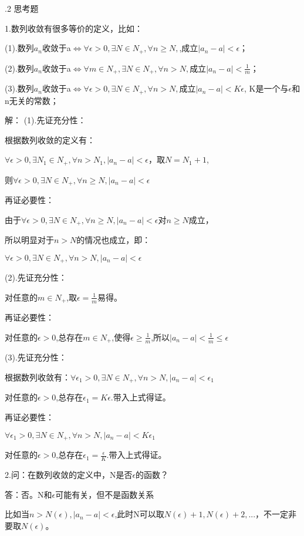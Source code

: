 \documentclass[12pt]{ctexart}
\begin{document}
.2 思考题

1.数列收敛有很多等价的定义，比如：

(1).数列${a_n}$收敛于a$\iff\forall{\epsilon}>0, \exists{N}\in{N_+},\forall{n}\ge{N,}$,成立$|a_n-a|<\epsilon$；

(2).数列${a_n}$收敛于a$\iff\forall{m}\in{N_+},\exists{N}\in{N_+},\forall{n}>{N,}$成立$|a_n-a|<\frac{1}{m}$；

(3).数列${a_n}$收敛于a$\iff\forall\epsilon>0,\exists{N}\in{N_+},\forall{n}>N,$成立$|a_n-a|<K\epsilon$, K是一个与$\epsilon$和n无关的常数；

解：
(1).先证充分性：

根据数列收敛的定义有：

$\forall\epsilon>0,\exists{N_1}\in{N_+},\forall{n}>{N_1},|a_n-a|<\epsilon$，取$N=N_1+1$,

则$\forall{\epsilon}>0, \exists{N}\in{N_+},\forall{n}\ge{N},|a_n-a|<\epsilon$

再证必要性：

由于$\forall{\epsilon}>0, \exists{N}\in{N_+},\forall{n}\ge{N},|a_n-a|<\epsilon$对$n\ge{N}$成立，

所以明显对于$n>N$的情况也成立，即：

$\forall{\epsilon}>0, \exists{N}\in{N_+},\forall{n}>{N},|a_n-a|<\epsilon$

(2).先证充分性：

对任意的$m\in{N_+}$,取$\epsilon=\frac{1}{m}$易得。

再证必要性：

对任意的$\epsilon>0$,总存在$m\in{N_+}$,使得$\epsilon\ge\frac{1}{m}$,所以$|a_n-a|<\frac{1}{m}\le\epsilon$

(3).先证充分性：

根据数列收敛有：$\forall\epsilon_1>0,\exists{N}\in{N_+},\forall{n}>N,|a_n-a|<\epsilon_1$

对任意的$\epsilon>0$,总存在$\epsilon_1=K\epsilon$.带入上式得证。

再证必要性：

$\forall\epsilon_1>0,\exists{N}\in{N_+},\forall{n}>N,|a_n-a|<K\epsilon_1$

对任意的$\epsilon>0$,总存在$\epsilon_1=\frac{\epsilon}{K}$.带入上式得证。

2.问：在数列收敛的定义中，N是否$\epsilon$的函数？

答：否。N和$\epsilon$可能有关，但不是函数关系

比如当$n>N(\epsilon),|a_n-a|<\epsilon$,此时N可以取$N(\epsilon)+1,N(\epsilon)+2,...$，不一定非要取$N(\epsilon)$。
\end{document}

